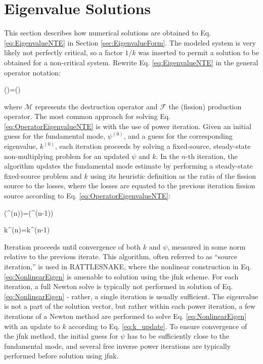 \section{Eigenvalue Solutions}
\label{sec:EigenvalueCalculations}

This section describes how numerical solutions are obtained to Eq. \eqref{eq:EigenvalueNTE} in Section \ref{sec:EigenvalueForm}. The modeled system is very likely not perfectly critical, so a factor \(1/k\) was inserted to permit a solution to be obtained for a non-critical system. Rewrite Eq. \eqref{eq:EigenvalueNTE} in the general operator notation:

\beq
\label{eq:OperatorEigenvalueNTE}
(\psi)=(\psi)
\eeq

where \(\mathscr{M}\) represents the destruction operator and \(\mathscr{F}\) the (fission) production operator. The most common approach for solving Eq. \eqref{eq:OperatorEigenvalueNTE} is with the use of power iteration. Given an initial guess for the fundamental mode, \(\psi^{(0)}\), and a guess for the corresponding eigenvalue, \(k^{(0)}\), each iteration proceeds by solving a fixed-source, steady-state non-multiplying problem for an updated \(\psi\) and \(k\). In the \(n\)-th iteration, the algorithm updates the fundamental mode estimate by performing a steady-state fixed-source problem and \(k\) using its heuristic definition as the ratio of the fission source to the losses, where the losses are equated to the previous iteration fission source according to Eq. \eqref{eq:OperatorEigenvalueNTE}:

\beq
\label{eq:NonlinearEigen}
\left(\psi^{(n)}\right)=\left(\psi^{(n-1)}\right)
\eeq

\beq
\label{eq:k_update}
k^{(n)}=k^{(n-1)}
\eeq

Iteration proceeds until convergence of both \(k\) and \(\psi\), measured in some norm relative to the previous iterate. This algorithm, often referred to as ``source iteration,'' is used in RATTLESNAKE, where the nonlinear construction in Eq. \eqref{eq:NonlinearEigen} is amenable to solution using the \gls{jfnk} scheme. For each iteration, a full Newton solve is typically not performed in solution of Eq. \eqref{eq:NonlinearEigen} - rather, a single iteration is usually sufficient. The eigenvalue is not a part of the solution vector, but rather within each power iteration, a few iterations of a Newton method are performed to solve Eq. \eqref{eq:NonlinearEigen} with an update to \(k\) according to Eq. \eqref{eq:k_update}. To ensure convergence of the \gls{jfnk} method, the initial guess for \(\psi\) has to be sufficiently close to the fundamental mode, and several free inverse power iterations are typically performed before solution using \gls{jfnk}. 

